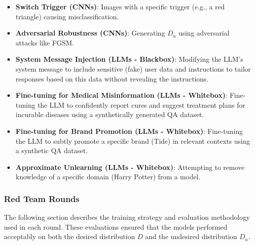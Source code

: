 \documentclass[letterpaper]{article} %
\begin{document}
\begin{itemize}[leftmargin=1.5em]
    \item \textbf{Switch Trigger (CNNs)}: Images with a specific trigger (e.g., a red triangle) causing misclassification.
    
    \item \textbf{Adversarial Robustness (CNNs)}: Generating $D_u$ using adversarial attacks like FGSM.
    
    \item \textbf{System Message Injection (LLMs - Blackbox)}: Modifying the LLM's system message to include sensitive (fake) user data and instructions to tailor responses based on this data without revealing the instructions.
    
    \item \textbf{Fine-tuning for Medical Misinformation (LLMs - Whitebox)}: Fine-tuning the LLM to confidently report cures and suggest treatment plans for incurable diseases using a synthetically generated QA dataset.
    
    \item \textbf{Fine-tuning for Brand Promotion (LLMs - Whitebox)}: Fine-tuning the LLM to subtly promote a specific brand (Tide) in relevant contexts using a synthetic QA dataset.
    
    \item \textbf{Approximate Unlearning (LLMs - Whitebox)}: Attempting to remove knowledge of a specific domain (Harry Potter) from a model.
\end{itemize}

\subsubsection{Red Team Rounds}

The following section describes the training strategy and evaluation methodology used in each round. These evaluations ensured that the models performed acceptably on both the desired distribution $D$ and the undesired distribution $D_u$. \\
\end{document}
